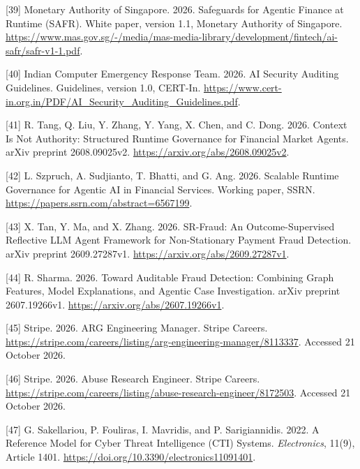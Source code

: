 \documentclass[acmlarge,nonacm]{acmart}
\newlength{\cslhangindent}
\newlength{\cslentryspacingunit} %
\newenvironment{CSLReferences}[2] %
 {\bibliofont %
  \setlength{\parindent}{0pt}
  \ifodd #1
  \let\oldpar\par
  \def\par{\hangindent=\cslhangindent\oldpar}
  \fi
  \setlength{\parskip}{#2\cslentryspacingunit}
 }%
 {}
\begin{document}
\begin{CSLReferences}{1}{1}
\leavevmode{}%
{[}39{]} Monetary Authority of Singapore. 2026. Safeguards for Agentic
Finance at Runtime (SAFR). White paper, version 1.1, Monetary Authority
of Singapore.
\url{https://www.mas.gov.sg/-/media/mas-media-library/development/fintech/ai-safr/safr-v1-1.pdf}.

\leavevmode{}%
{[}40{]} Indian Computer Emergency Response Team. 2026. AI Security
Auditing Guidelines. Guidelines, version 1.0, CERT-In.
\url{https://www.cert-in.org.in/PDF/AI_Security_Auditing_Guidelines.pdf}.

\leavevmode{}%
{[}41{]} R. Tang, Q. Liu, Y. Zhang, Y. Yang, X. Chen, and C. Dong. 2026.
Context Is Not Authority: Structured Runtime Governance for Financial
Market Agents. arXiv preprint 2608.09025v2.
\url{https://arxiv.org/abs/2608.09025v2}.

\leavevmode{}%
{[}42{]} L. Szpruch, A. Sudjianto, T. Bhatti, and G. Ang. 2026. Scalable
Runtime Governance for Agentic AI in Financial Services. Working paper,
SSRN. \url{https://papers.ssrn.com/abstract=6567199}.

\leavevmode{}%
{[}43{]} X. Tan, Y. Ma, and X. Zhang. 2026. SR-Fraud: An
Outcome-Supervised Reflective LLM Agent Framework for Non-Stationary
Payment Fraud Detection. arXiv preprint 2609.27287v1.
\url{https://arxiv.org/abs/2609.27287v1}.

\leavevmode{}%
{[}44{]} R. Sharma. 2026. Toward Auditable Fraud Detection: Combining
Graph Features, Model Explanations, and Agentic Case Investigation.
arXiv preprint 2607.19266v1. \url{https://arxiv.org/abs/2607.19266v1}.

\leavevmode{}%
{[}45{]} Stripe. 2026. ARG Engineering Manager. Stripe Careers.
\url{https://stripe.com/careers/listing/arg-engineering-manager/8113337}.
Accessed 21 October 2026.

\leavevmode{}%
{[}46{]} Stripe. 2026. Abuse Research Engineer. Stripe Careers.
\url{https://stripe.com/careers/listing/abuse-research-engineer/8172503}.
Accessed 21 October 2026.

\leavevmode{}%
{[}47{]} G. Sakellariou, P. Fouliras, I. Mavridis, and P. Sarigiannidis.
2022. A Reference Model for Cyber Threat Intelligence (CTI) Systems.
\emph{Electronics}, 11(9), Article 1401.
\url{https://doi.org/10.3390/electronics11091401}.


\end{CSLReferences}
\end{document}

